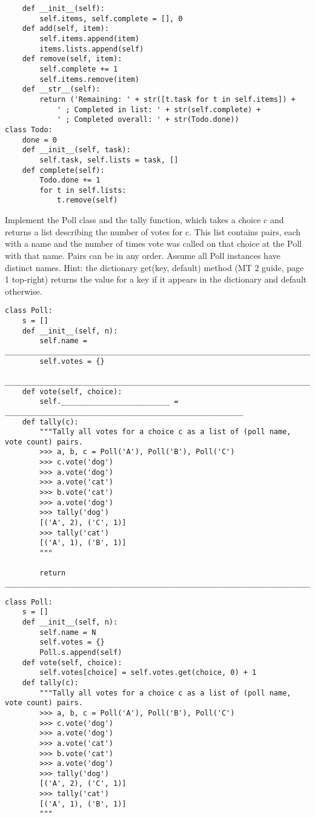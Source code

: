 \documentclass{exam}
\begin{document}
\begin{questions}
\begin{solution}
\begin{lstlisting}
	def __init__(self):
		self.items, self.complete = [], 0
	def add(self, item):
		self.items.append(item)
		items.lists.append(self)
	def remove(self, item):
		self.complete += 1
		self.items.remove(item)
	def __str__(self):
		return ('Remaining: ' + str([t.task for t in self.items]) + 
			' ; Completed in list: ' + str(self.complete) +
			' ; Completed overall: ' + str(Todo.done))
class Todo:
	done = 0
	def __init__(self, task):
		self.task, self.lists = task, []
	def complete(self):
		Todo.done += 1
		for t in self.lists:
			t.remove(self)
\end{lstlisting}
\end{solution}

\begin{blocksection}
	Implement the Poll class and the tally function, which takes a choice c and returns a list
	describing the number of votes for c. This list contains pairs, each with a name and the number of times
	vote was called on that choice at the Poll with that name. Pairs can be in any order. Assume all Poll
	instances have distinct names. Hint: the dictionary get(key, default) method (MT 2 guide, page 1
	top-right) returns the value for a key if it appears in the dictionary and default otherwise.
\begin{lstlisting}
class Poll:
	s = []
	def __init__(self, n):
		self.name = ____________________________________________________________________________
		self.votes = {}
		________________________________________________________________________________________
	def vote(self, choice):
		self._________________________ = _______________________________________________________
	def tally(c):
		"""Tally all votes for a choice c as a list of (poll name, vote count) pairs.
		>>> a, b, c = Poll('A'), Poll('B'), Poll('C')
		>>> c.vote('dog')
		>>> a.vote('dog')
		>>> a.vote('cat')
		>>> b.vote('cat')
		>>> a.vote('dog')
		>>> tally('dog')
		[('A', 2), ('C', 1)]
		>>> tally('cat')
		[('A', 1), ('B', 1)]
		"""
		
		return _____________________________________________________________________________________		
\end{lstlisting}
\end{blocksection}
\begin{solution}
	\begin{lstlisting}
class Poll:
	s = []
	def __init__(self, n):
		self.name = N
		self.votes = {}
		Poll.s.append(self)
	def vote(self, choice):
		self.votes[choice] = self.votes.get(choice, 0) + 1
	def tally(c):
		"""Tally all votes for a choice c as a list of (poll name, vote count) pairs.
		>>> a, b, c = Poll('A'), Poll('B'), Poll('C')
		>>> c.vote('dog')
		>>> a.vote('dog')
		>>> a.vote('cat')
		>>> b.vote('cat')
		>>> a.vote('dog')
		>>> tally('dog')
		[('A', 2), ('C', 1)]
		>>> tally('cat')
		[('A', 1), ('B', 1)]
		"""
		

\end{lstlisting}
\end{solution}
\end{questions}
\end{document}
